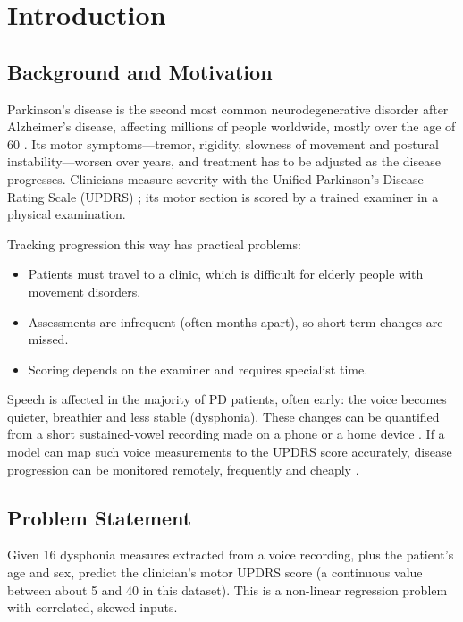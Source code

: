 \documentclass[12pt,a4paper]{article}
\numberwithin{equation}{section}
\numberwithin{table}{section}
\numberwithin{figure}{section}
\begin{document}
\newpage

\section{Introduction}

\subsection{Background and Motivation}
Parkinson's disease is the second most common neurodegenerative disorder after Alzheimer's disease, affecting millions of people worldwide, mostly over the age of 60 \cite{poewe2017}. Its motor symptoms---tremor, rigidity, slowness of movement and postural instability---worsen over years, and treatment has to be adjusted as the disease progresses. Clinicians measure severity with the Unified Parkinson's Disease Rating Scale (UPDRS) \cite{goetz2008}; its motor section is scored by a trained examiner in a physical examination.

Tracking progression this way has practical problems:
\begin{itemize}
  \item Patients must travel to a clinic, which is difficult for elderly people with movement disorders.
  \item Assessments are infrequent (often months apart), so short-term changes are missed.
  \item Scoring depends on the examiner and requires specialist time.
\end{itemize}

Speech is affected in the majority of PD patients, often early: the voice becomes quieter, breathier and less stable (dysphonia). These changes can be quantified from a short sustained-vowel recording made on a phone or a home device \cite{little2009}. If a model can map such voice measurements to the UPDRS score accurately, disease progression can be monitored remotely, frequently and cheaply \cite{tsanas2010}.

\subsection{Problem Statement}
Given 16 dysphonia measures extracted from a voice recording, plus the patient's age and sex, predict the clinician's motor UPDRS score (a continuous value between about 5 and 40 in this dataset). This is a non-linear regression problem with correlated, skewed inputs.
\end{document}
